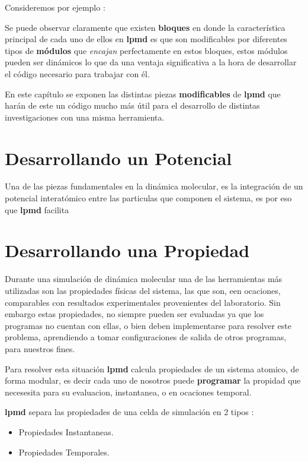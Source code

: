 \documentclass[a4paper,10pt]{scrbook}
\newcommand{\lpmd}{\textbf{lpmd }}
\begin{document}
Consideremos por ejemplo :

Se puede observar claramente que existen \textbf{bloques} en donde la caracter\'istica principal de cada uno de ellos en \lpmd es que son modificables por diferentes tipos de \textbf{m\'odulos} que \textit{encajan} perfectamente en estos bloques, estos m\'odulos pueden ser din\'amicos lo que da una ventaja significativa a la hora de desarrollar el c\'odigo necesario para trabajar con \'el.

En este cap\'itulo se exponen las distintas piezas \textbf{modificables} de \lpmd que har\'an de este un c\'odigo mucho m\'as \'util para el desarrollo de distintas investigaciones con una misma herramienta.

\section{Desarrollando un Potencial}

Una de las piezas fundamentales en la din\'amica molecular, es la integraci\'on de un potencial interat\'omico entre las particulas que componen el sistema, es por eso que \lpmd facilita 

\section{Desarrollando una Propiedad}

Durante una simulaci\'on de din\'amica molecular una de las herramientas m\'as utilizadas  son las propiedades f\'isicas del sistema, las que son, een ocaciones, comparables con resultados experimentales provenientes del laboratorio. Sin embargo estas propiedades, no siempre pueden ser evaluadas ya que los programas no cuentan con ellas, o bien deben implementarse para resolver este problema, aprendiendo a tomar configuraciones de salida de otros programas, para nuestros fines.

Para resolver esta situaci\'on \lpmd calcula propiedades de un sistema atomico, de forma modular, es decir cada uno de nosotros puede \textbf{programar} la propidad que necesesita para su evaluacion, instantanea, o en ocaciones temporal.

\lpmd separa las propiedades de una celda de simulaci\'on en 2 tipos :

\begin{itemize}
 \item Propiedades Instantaneas.
 \item Propiedades Temporales.
\end{itemize}
\end{document}
